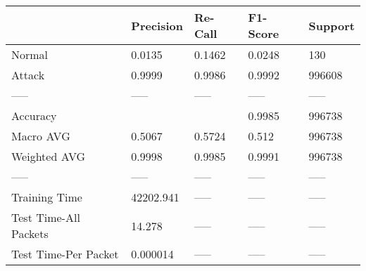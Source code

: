 \begin{tabular}{lllll}
\toprule
{} &  Precision & Re-Call & F1-Score & Support \\
\midrule
Normal                &     0.0135 &  0.1462 &   0.0248 &     130 \\
Attack                &     0.9999 &  0.9986 &   0.9992 &  996608 \\
-----                 &      ----- &   ----- &    ----- &   ----- \\
Accuracy              &            &         &   0.9985 &  996738 \\
Macro AVG             &     0.5067 &  0.5724 &    0.512 &  996738 \\
Weighted AVG          &     0.9998 &  0.9985 &   0.9991 &  996738 \\
-----                 &      ----- &   ----- &    ----- &   ----- \\
Training Time         &  42202.941 &   ----- &    ----- &   ----- \\
Test Time-All Packets &     14.278 &   ----- &    ----- &   ----- \\
Test Time-Per Packet  &   0.000014 &   ----- &    ----- &   ----- \\
\bottomrule
\end{tabular}
